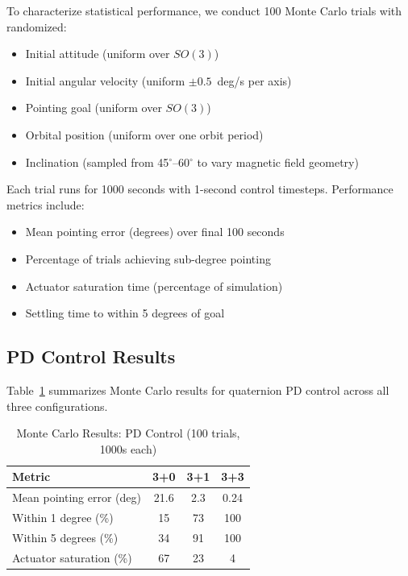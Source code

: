 \documentclass[9pt]{extarticle}
\begin{document}
To characterize statistical performance, we conduct 100 Monte Carlo trials with randomized:
\begin{itemize}
    \item Initial attitude (uniform over $SO(3)$)
    \item Initial angular velocity (uniform $\pm 0.5$~deg/s per axis)
    \item Pointing goal (uniform over $SO(3)$)
    \item Orbital position (uniform over one orbit period)
    \item Inclination (sampled from 45$^\circ$--60$^\circ$ to vary magnetic field geometry)
\end{itemize}

Each trial runs for 1000 seconds with 1-second control timesteps. Performance metrics include:
\begin{itemize}
    \item Mean pointing error (degrees) over final 100 seconds
    \item Percentage of trials achieving sub-degree pointing
    \item Actuator saturation time (percentage of simulation)
    \item Settling time to within 5 degrees of goal
\end{itemize}

\subsection{PD Control Results}

Table~\ref{tab:pd_results} summarizes Monte Carlo results for quaternion PD control across all three configurations.

\begin{table}[h]
    \centering
    \caption{Monte Carlo Results: PD Control (100 trials, 1000s each)}
    \label{tab:pd_results}
    \begin{tabular}{lccc}
        \toprule
        Metric & 3+0 & 3+1 & 3+3 \\
        \midrule
        Mean pointing error (deg) & 21.6 & 2.3 & 0.24 \\
        Within 1 degree (\%) & 15 & 73 & 100 \\
        Within 5 degrees (\%) & 34 & 91 & 100 \\
        Actuator saturation (\%) & 67 & 23 & 4 \\
        \bottomrule
    \end{tabular}
\end{table}
\end{document}
